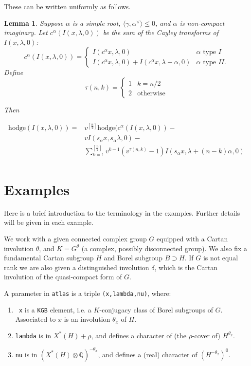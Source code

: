 \documentclass[12pt,leqno]{article}
\newtheorem{lemma}[equation]{Lemma}
\newcommand{\hodge}{\text{hodge}}
\newcommand{\Q}{\mathbb Q}
\newcommand{\ch}[1]{#1^\vee}
\renewcommand{\sec}[1]{\section{#1}
\renewcommand{\theequation}{\thesection.\arabic{equation}}
  \setcounter{equation}{0}}
\renewcommand{\sec}[1]{\section{#1}
\renewcommand{\theequation}{\thesection.\arabic{equation}}
  \setcounter{equation}{0}}
\begin{document}
These can be written uniformly as follows.

\begin{lemma}
Suppose $\alpha$ is a simple root, $\langle\gamma,\ch\alpha\rangle\le 0$, and $\alpha$ is non-compact imaginary.
Let $c^\alpha(I(x,\lambda,0))$  be the sum of the Cayley transforms of $I(x,\lambda,0)$:
$$
c^\alpha(I(x,\lambda,0))=
\begin{cases}
I(c^\alpha x,\lambda,0)& \alpha\text{ type }I\\
I(c^\alpha x,\lambda,0)+I(c^\alpha x,\lambda+\alpha,0)& \alpha\text{ type }II.
\end{cases}
$$
Define
$$
\tau(n,k)=
\begin{cases}
1&k=n/2\\
2&\text{otherwise}
\end{cases}
$$

Then

{\normalfont
$$
\begin{aligned}
\hodge(I(x,\lambda,0))=&
v^{[\frac n2]}\hodge(c^\alpha(I(x,\lambda,0))-
\\&vI(s_\alpha x,s_\alpha\lambda,0)-\\
&\sum_{k=1}^{[\frac n2]}v^{k-1}(v^{\tau(n,k)}-1)I(s_\alpha x,\lambda+(n-k)\alpha,0)\\
\end{aligned}
$$
}
\end{lemma}


\sec{Examples}
\label{s:examples}

Here is a brief introduction to the terminology in the
examples. Further details will be given in each example.

We work with a given connected complex group $G$ equipped with a Cartan
involution $\theta$, and $K=G^\theta$ (a complex, possibly
disconnected group). We also fix a fundamental Cartan subgroup $H$ and
Borel subgroup $B\supset H$.  If $G$ is not equal rank we are also
given a distinguished involution $\delta$, which is the Cartan
involution of the quasi-compact form of $G$.

A parameter in {\tt atlas} is a triple {\tt (x,lambda,nu)}, where:
\begin{enumerate}
\item {\tt
  x} is a {\tt KGB} element, i.e. a $K$-conjugacy class of Borel subgroups
of $G$. Associated to $x$ is an involution $\theta_x$ of $H$.
\item {\tt lambda} is in $X^*(H)+\rho$, and defines a character of (the $\rho$-cover of) $H^{\theta_x}$.
\item {\tt nu} is in $(X^*(H)\otimes\Q)^{-\theta_x}$, and defines a (real) character of $(H^{-\theta_x})^0$.
\end{enumerate}
\end{document}
